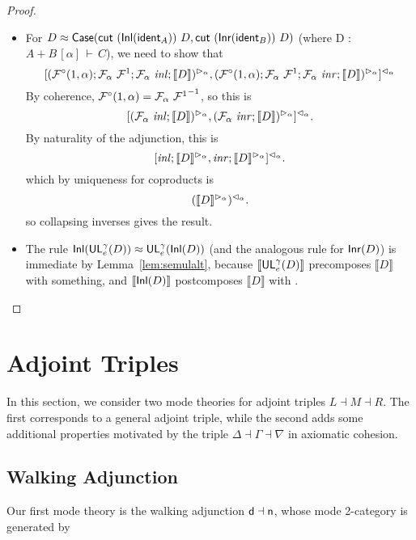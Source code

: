 \documentclass{drl-common/llncs}
\renewcommand{\sem}[1]{\ensuremath{ \llbracket #1 \rrbracket}}
\newcommand{\inv}[1]{\ensuremath{{#1}^{-1}}}
\newcommand{\la}{\ensuremath{\dashv}}
\newcommand\coprd[2]{\ensuremath{#1 + #2}}
\newcommand\seq[3]{\ensuremath{#1 \, [ #2 ] \, \vdash \, #3}}
\newcommand\ident[1]{\ensuremath{\dsd{ident}_{#1}}}
\newcommand\cutsym{\ensuremath{\dsd{cut}}}
\newcommand\cut[2]{\ensuremath{{\cutsym \,\, #1 \,\, #2}}}
\newcommand\Inl[1]{\ensuremath{\dsd{Inl}(#1)}}
\newcommand\Inr[1]{\ensuremath{\dsd{Inr}(#1)}}
\newcommand\Case[2]{\ensuremath{\dsd{Case}(#1,#2)}}
\newcommand\UL[3]{\ensuremath{\dsd{UL}^{#1}_{#2}(#3)}}
\newcommand\ap[2]{\ensuremath{#1 \approx #2}}
\begin{document}
\begin{proof}
\begin{itemize}
\item For 
{\ap D {\Case{\cut{(\Inl{\ident{A}})}{D}}{\cut{(\Inr{\ident{B}})}{D}}}}
(where {D : \seq{\coprd{A}{B}}{\alpha}{C}}),
we need to show that
\[
\semrtol{\semcase{\semltor{(\semFcomp(1,\alpha);\semF{\alpha}{\semFone};\semF{\alpha}{\seminl};\sem{D})}{\alpha}}{\semltor{(\semFcomp(1,\alpha);\semF{\alpha}{\semFone};\semF{\alpha}{\seminr};\sem{D})}{\alpha}}}{\alpha}
\]
By coherence, $\semFcomp(1,\alpha) = \inv{\semF{\alpha}{\semFone}}$, so
  this is
\[
\semrtol{\semcase{\semltor{(\semF{\alpha}{\seminl};\sem{D})}{\alpha}}{\semltor{(\semF{\alpha}{\seminr};\sem{D})}{\alpha}}}{\alpha}.
\]
By naturality of the adjunction, this is 
\[
\semrtol{\semcase{{\seminl};\semltor{\sem{D}}{\alpha}}{{\seminr};\semltor{\sem{D}}{\alpha}}}{\alpha}.
\]
which by uniqueness for coproducts is 
\[
\semrtol{(\semltor{\sem{D}}{\alpha})}{\alpha}.
\]
so collapsing inverses gives the result.  

\item The rule \ap{\Inl{\UL{\gamma}{e}{D}}}{\UL{\gamma}{e}{\Inl D}} (and
  the analogous rule for \Inr{D}) is immediate by
  Lemma~\ref{lem:semulalt}, because \sem{\UL{\gamma}{e}{D}} precomposes
  \sem{D} with something, and \sem{\Inl{D}} postcomposes \sem{D} with
  \seminl.

\end{itemize}
\end{proof}

\section{Adjoint Triples}
\label{sec:triple}

In this section, we consider two mode theories for adjoint triples $L
\la M \la R$.  The first corresponds to a general adjoint triple, while
the second adds some additional properties motivated by the triple
$\Delta \la \Gamma \la \nabla$ in axiomatic cohesion.  

\subsection{Walking Adjunction}

Our first mode theory is the walking adjunction $\dsd d \la \dsd n$,
whose mode 2-category is generated by
\end{document}
